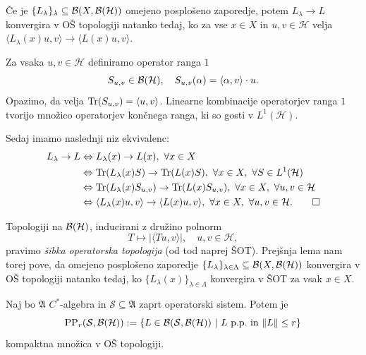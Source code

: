 \begin{lema}
    Če je $\{L_\lambda\}_\lambda \subseteq \mathcal{B} (X, \operatorname{\mathcal{B} (\mathcal{H})})$ omejeno posplošeno zaporedje,
    potem $L_\lambda \to L$ konvergira v OŠ topologiji natanko tedaj, ko za vse $x \in X$ in $u, v \in \mathcal{H}$ velja
    $\langle L_\lambda (x) u, v \rangle \to \langle L(x) u, v \rangle$.
\end{lema}

\begin{dokaz}
    Za vsaka $u, v \in \mathcal{H}$ definiramo operator ranga $1$ 
    $$S_{u, v} \in \operatorname{\mathcal{B} (\mathcal{H})},\quad S_{u, v} (\alpha) = \langle \alpha, v \rangle \cdot u.$$
    Opazimo, da velja $\operatorname{Tr} (S_{u, v}) = \langle u, v\rangle$.
    Linearne kombinacije operatorjev ranga $1$ tvorijo množico operatorjev končnega ranga,
    ki so gosti v $L^1 (\mathcal{H})$. 

    Sedaj imamo naslednji niz ekvivalenc:
    \begin{align*}
        L_\lambda \to L &\Leftrightarrow L_\lambda (x) \to L (x),\ \forall x \in X \\
        &\Leftrightarrow \tr (L_\lambda (x) S) \to \tr (L (x) S),\ \forall x \in X,\ \forall S \in L^1 (\mathcal{H})\\
        &\Leftrightarrow \tr (L_\lambda (x) S_{u, v}) \to \tr (L (x) S_{u, v}),\ \forall x \in X,\ \forall u, v \in \mathcal{H}\\
        &\Leftrightarrow \langle L_\lambda (x) u, v \rangle \to \langle L (x) u, v \rangle,\ \forall x \in X,\ \forall u, v \in \mathcal{H}. \qedhere
    \end{align*}
\end{dokaz}

\begin{opomba}
    Topologiji na $\operatorname{\mathcal{B} (\mathcal{H})}$, inducirani z družino polnorm 
    $$T \mapsto |\langle Tu, v\rangle|,\quad u, v \in \mathcal{H},$$
    pravimo \emph{šibka operatorska topologija} (od tod naprej ŠOT).
    Prejšnja lema nam torej pove, da omejeno posplošeno zaporedje $\{L_\lambda\}_{\lambda \in \Lambda} \subseteq \mathcal{B}(X, \operatorname{\mathcal{B} (\mathcal{H})})$
    konvergira v OŠ topologiji natanko tedaj, ko $\{L_\lambda (x)\}_{\lambda \in \Lambda}$
    konvergira v ŠOT za vsak $x \in X$.
\end{opomba}

\begin{lema}\label{lem:1.5}
    Naj bo $\mathfrak{A}$ $C^*$-algebra in $\mathcal{S} \subseteq \mathfrak{A}$ zaprt operatorski sistem. Potem je 
    $$\PP_r (\mathcal{S}, \bh) := \{L \in \mathcal{B} (\mathcal{S}, \bh)\ |\ \textrm{$L$ p.p.~in $\| L\| \leq r$}\}$$
    kompaktna množica v OŠ topologiji.
\end{lema}

